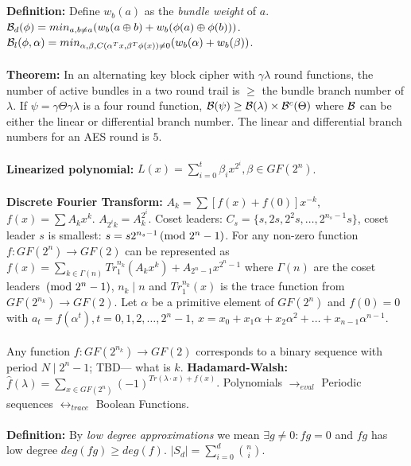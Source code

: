 \\
\\
{\bf Definition:}
Define $w_b(a)$ as the \emph{bundle weight} of $a$.  
${\cal B}_d(\phi)= min_{a, b \ne a} (w_b(a \oplus b) + w_b(\phi(a) \oplus \phi(b)))$.
${\cal B}_l(\phi, \alpha)= min_{\alpha, \beta, C(\alpha^Tx, \beta^T \phi(x)) \ne 0} (w_b(\alpha) + w_b(\beta))$.
\\
\\
{\bf Theorem:} In an alternating key block cipher with $\gamma \lambda$ round functions,
the number of active bundles in a two round trail is $\ge$ the bundle branch number of
$\lambda$. If $\psi= \gamma \Theta \gamma \lambda$ is a four round function, 
${\cal B}(\psi) \ge {\cal B}(\lambda) \times {\cal B}^c(\Theta)$ where ${\cal B}$ can
be either the linear or differential branch number.  The linear and differential branch
numbers for an AES round is $5$.
\\
\\
{\bf Linearized polynomial:} $L(x) = \sum_{i=0}^t \beta_i x^{2^i}, \beta \in GF(2^n)$.
\\
\\
{\bf Discrete Fourier Transform:} $A_k= \sum [f(x) + f(0)]x^{-k}$, 
$f(x)= \sum A_k x^k$.  $A_{2^i k} = A_k^{2^i}$.  Coset leaders:
$C_s = \{s, 2s, 2^2 s , \ldots , 2^{n_s-1}s \}$, coset leader $s$ is
smallest: $s=s 2^{n_s-1} \thinspace \textnormal{(mod } 2^n -1 \textnormal{)}$.  For any non-zero function
$f: GF(2^n) \rightarrow GF(2)$ can be represented as
$f(x) = \sum_{k \in \Gamma(n)} Tr_1^{n_k} (A_k x^k) + A_{2^n-1} x^{2^n-1}$ where
$\Gamma(n)$ are the coset leaders $\thinspace \textnormal{(mod } 2^n-1 \textnormal{)}$, $n_k \mid n$ and
$Tr_1^{n_k}(x)$ is the trace function from 
$GF(2^{n_k}) \rightarrow GF(2)$.
Let $\alpha$ be a primitive element of $GF(2^n)$ and $f(0)=0$ with
$a_t = f(\alpha^t), t= 0, 1, 2, \ldots, 2^n-1$,
$x= x_0 + x_1 \alpha + x_2 \alpha^2 + \ldots + x_{n-1} \alpha^{n-1}$.
\\
\\
Any function 
$f: GF(2^{n_k}) \rightarrow GF(2)$ corresponds to a binary sequence with period
$N \mid 2^n-1$; TBD--- what is $k$.
{\bf Hadamard-Walsh:} 
${\hat f}(\lambda)= \sum_{x \in GF(2^n)} (-1)^{Tr(\lambda \cdot x)+f(x)}$.
Polynomials $\rightarrow_{eval}$ Periodic sequences $\leftrightarrow_{trace}$
Boolean Functions.
\\
\\
{\bf Definition:}
By \emph{low degree approximations} we mean
$\exists g \ne 0: fg= 0$ and $fg$ has low degree
$deg(fg) \ge deg(f)$.  $| S_d |= \sum_{i=0}^d {n \choose i}$.
\\
